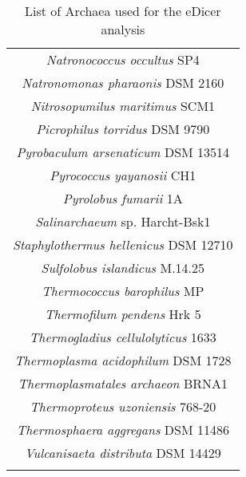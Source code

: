 \begin{center}
\begin{longtable}{|c|}
\textit{Natronococcus occultus} SP4\\
\textit{Natronomonas pharaonis} DSM 2160\\
\textit{Nitrosopumilus maritimus} SCM1\\
\textit{Picrophilus torridus} DSM 9790\\
\textit{Pyrobaculum arsenaticum} DSM 13514\\
\textit{Pyrococcus yayanosii} CH1\\
\textit{Pyrolobus fumarii} 1A\\
\textit{Salinarchaeum} sp. Harcht-Bsk1\\
\textit{Staphylothermus hellenicus} DSM 12710\\
\textit{Sulfolobus islandicus} M.14.25\\
\textit{Thermococcus barophilus} MP\\
\textit{Thermofilum pendens} Hrk 5\\
\textit{Thermogladius cellulolyticus} 1633\\
\textit{Thermoplasma acidophilum} DSM 1728\\
\textit{Thermoplasmatales archaeon} BRNA1\\
\textit{Thermoproteus uzoniensis} 768-20\\
\textit{Thermosphaera aggregans} DSM 11486\\
\textit{Vulcanisaeta distributa} DSM 14429\\
\hline
\caption[Archeaa Used in eDicer Anaylsis]{List of Archaea
used for the eDicer analysis}
\label{tab:edicer_archaea}
\end{longtable}
\end{center}



